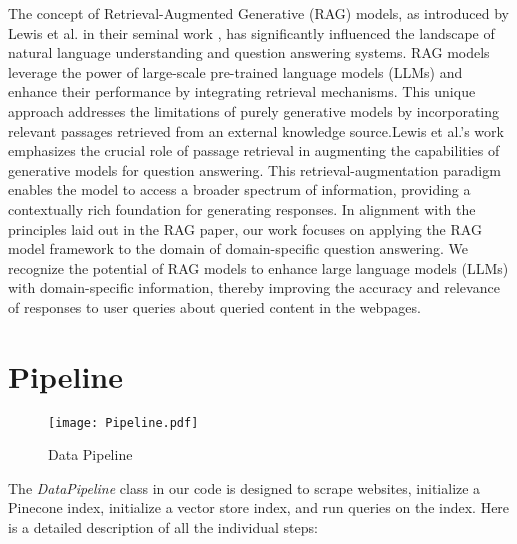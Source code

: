 \documentclass[sigconf,natbib=true,anonymous=false]{acmart}
\begin{document}
The concept of Retrieval-Augmented Generative (RAG) models, as introduced by Lewis et al. in their seminal work \cite{DBLP:journals/corr/abs-2005-11401}, has significantly influenced the landscape of natural language understanding and question answering systems. RAG models leverage the power of large-scale pre-trained language models (LLMs) and enhance their performance by integrating retrieval mechanisms. This unique approach addresses the limitations of purely generative models by incorporating relevant passages retrieved from an external knowledge source.Lewis et al.'s work emphasizes the crucial role of passage retrieval in augmenting the capabilities of generative models for question answering. This retrieval-augmentation paradigm enables the model to access a broader spectrum of information, providing a contextually rich foundation for generating responses.
In alignment with the principles laid out in the RAG paper, our work focuses on applying the RAG model framework to the domain of domain-specific question answering. We recognize the potential of RAG models to enhance large language models (LLMs) with domain-specific information, thereby improving the accuracy and relevance of responses to user queries about queried content in the webpages.


\section{Pipeline}

\begin{figure}[H]
    \centering
    \texttt{[image: Pipeline.pdf]}
    \caption{Data Pipeline}
    \label{fig:enter-label}
\end{figure}

The \textit{DataPipeline} class in our code is designed to scrape websites, initialize a Pinecone index, initialize a vector store index, and run queries on the index. Here is a detailed description of all the individual steps:
\end{document}
